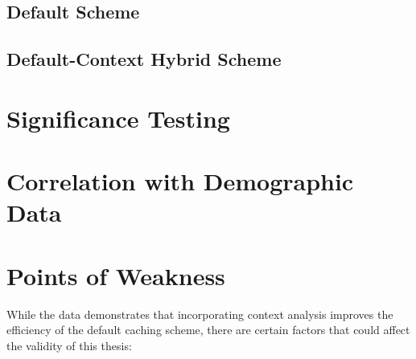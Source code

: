 \documentclass[12pt]{uthesis-v12}  %
\begin{document}
			\subsection{Default Scheme}
			
			\subsection{Default-Context Hybrid Scheme}	 
		\section{Significance Testing}	
		
		\section{Correlation with Demographic Data}

		\section{Points of Weakness}
			While the data demonstrates that incorporating context analysis improves the efficiency of the default caching scheme, there are certain factors that could affect the validity of this thesis:
			
\end{document}
